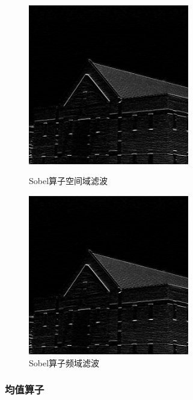 \documentclass[11pt, a4paper, UTF8]{ctexart}
\begin{document}
  \begin{figure}[H]
    \centering
    \begin{minipage}[t]{0.48\textwidth}
    \centering
    \includegraphics[width=7cm]{sobel_space.jpg}
    \caption{Sobel算子空间域滤波}
    \end{minipage}
    \begin{minipage}[t]{0.48\textwidth}
    \centering
    \includegraphics[width=7cm]{sobel_freq.jpg}
    \caption{Sobel算子频域滤波}
    \end{minipage}
  \end{figure}


  \subsubsection{均值算子}
\end{document}
